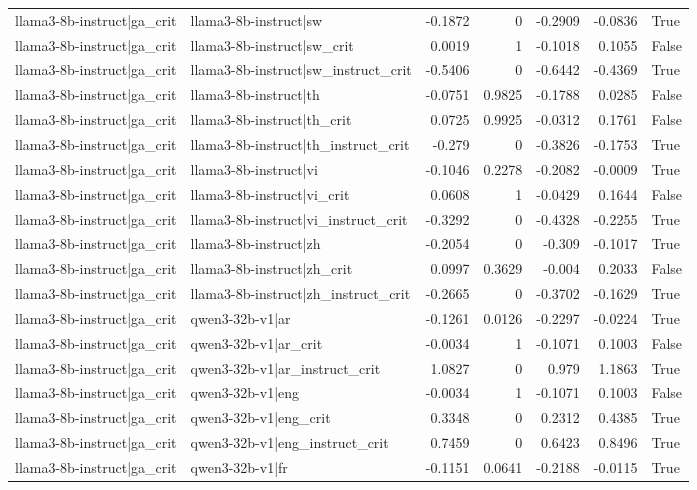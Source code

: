 \begin{table}
\begin{tabular}{l l r r r r l}
llama3-8b-instruct|ga_crit & llama3-8b-instruct|sw & -0.1872 & 0 & -0.2909 & -0.0836 & True \\
llama3-8b-instruct|ga_crit & llama3-8b-instruct|sw_crit & 0.0019 & 1 & -0.1018 & 0.1055 & False \\
llama3-8b-instruct|ga_crit & llama3-8b-instruct|sw_instruct_crit & -0.5406 & 0 & -0.6442 & -0.4369 & True \\
llama3-8b-instruct|ga_crit & llama3-8b-instruct|th & -0.0751 & 0.9825 & -0.1788 & 0.0285 & False \\
llama3-8b-instruct|ga_crit & llama3-8b-instruct|th_crit & 0.0725 & 0.9925 & -0.0312 & 0.1761 & False \\
llama3-8b-instruct|ga_crit & llama3-8b-instruct|th_instruct_crit & -0.279 & 0 & -0.3826 & -0.1753 & True \\
llama3-8b-instruct|ga_crit & llama3-8b-instruct|vi & -0.1046 & 0.2278 & -0.2082 & -0.0009 & True \\
llama3-8b-instruct|ga_crit & llama3-8b-instruct|vi_crit & 0.0608 & 1 & -0.0429 & 0.1644 & False \\
llama3-8b-instruct|ga_crit & llama3-8b-instruct|vi_instruct_crit & -0.3292 & 0 & -0.4328 & -0.2255 & True \\
llama3-8b-instruct|ga_crit & llama3-8b-instruct|zh & -0.2054 & 0 & -0.309 & -0.1017 & True \\
llama3-8b-instruct|ga_crit & llama3-8b-instruct|zh_crit & 0.0997 & 0.3629 & -0.004 & 0.2033 & False \\
llama3-8b-instruct|ga_crit & llama3-8b-instruct|zh_instruct_crit & -0.2665 & 0 & -0.3702 & -0.1629 & True \\
llama3-8b-instruct|ga_crit & qwen3-32b-v1|ar & -0.1261 & 0.0126 & -0.2297 & -0.0224 & True \\
llama3-8b-instruct|ga_crit & qwen3-32b-v1|ar_crit & -0.0034 & 1 & -0.1071 & 0.1003 & False \\
llama3-8b-instruct|ga_crit & qwen3-32b-v1|ar_instruct_crit & 1.0827 & 0 & 0.979 & 1.1863 & True \\
llama3-8b-instruct|ga_crit & qwen3-32b-v1|eng & -0.0034 & 1 & -0.1071 & 0.1003 & False \\
llama3-8b-instruct|ga_crit & qwen3-32b-v1|eng_crit & 0.3348 & 0 & 0.2312 & 0.4385 & True \\
llama3-8b-instruct|ga_crit & qwen3-32b-v1|eng_instruct_crit & 0.7459 & 0 & 0.6423 & 0.8496 & True \\
llama3-8b-instruct|ga_crit & qwen3-32b-v1|fr & -0.1151 & 0.0641 & -0.2188 & -0.0115 & True \\

\end{tabular}
\end{table}
